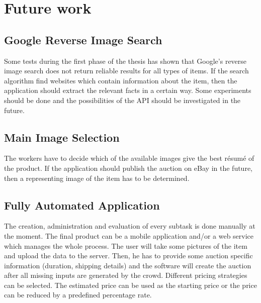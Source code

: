 \section{Future work}
\subsection{Google Reverse Image Search}
Some tests during the first phase of the thesis has shown that Google's reverse image search does not return reliable results for all types of items. If the search algorithm find websites which contain information about the item, then the application should extract the relevant facts in a certain way. Some experiments should be done and the possibilities of the API should be investigated in the future. 
\subsection{Main Image Selection}
The workers have to decide which of the available images give the best r\'{e}sum\'{e} of the product. If the application should publish the auction on eBay in the future, then a representing image of the item has to be determined. 
\subsection{Fully Automated Application}
The creation, administration and evaluation of every subtask is done manually at the moment. The final product can be a mobile application and/or a web service which manages the whole process. The user will take some pictures of the item and upload the data to the server. Then, he has to provide some auction specific information (duration, shipping details) and the software will create the auction after all missing inputs are generated by the crowd. Different pricing strategies can be selected. The estimated price can be used as the starting price or the price can be reduced by a predefined percentage rate. 
